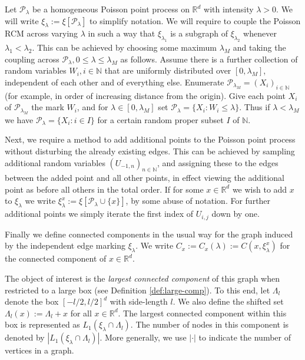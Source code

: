 \documentclass[a4paper,12pt]{scrartcl}
\newcommand{\nats}{\mathbb{N}}
\newcommand{\reals}{\mathbb{R}}
\theoremstyle{definition}
\theoremstyle{remark}
\begin{document}
Let $\mathcal P_\lambda$ be a homogeneous Poisson point process on $\reals^d$ with intensity $\lambda>0$.
We will write $\xi_\lambda := \xi[\mathcal P_\lambda]$ to simplify notation.
We will require to couple the Poisson RCM across varying $\lambda$ in
such a way that $\xi_{\lambda_1}$ is a subgraph of $\xi_{\lambda_2}$
whenever $\lambda_1 < \lambda_2$.
This can be achieved by choosing some maximum $\lambda_M$ and taking the coupling across $\mathcal P_\lambda, 0 \leq \lambda \leq \lambda_M$ as follows.
Assume there is a further collection of random variables
$W_i, i \in \mathbb N$ that are uniformly distributed over $[0,\lambda_M]$,
independent of each other and of everything else. Enumerate
$\mathcal P_{\lambda_M} = (X_i)_{i \in \mathbb N}$ (for example, in order of increasing distance from the origin). %
Give each point
$X_i$ of $\mathcal P_{\lambda_M}$ the mark $W_i$, and for $\lambda \in [0, \lambda_M]$ set $\mathcal P_{\lambda} = \{X_{i}: W_i \leq \lambda \}$.
Thus if $\lambda  < \lambda_M$ we have $\mathcal P_{\lambda}  =
\{X_i: i \in I\}$ for a certain random proper subset $I$ of $\mathbb N$.


Next, we require a method to add additional points to the Poisson point process without disturbing the already existing edges. This can be achieved by sampling additional random variables $(U_{-1, n})_{n\in\nats}$, and assigning these to the edges between the added point and all other points, in effect viewing the additional point as before all others in the total order. If for some $x\in\reals^d$ we wish to add $x$ to $\xi_\lambda$ we write $\xi_\lambda^x := \xi[\mathcal P_\lambda\cup \{x\}]$, by some abuse of notation.
For further additional points we simply iterate the first index of $U_{i, j}$ down by one.

Finally we define connected components in the usual way for the graph induced by the independent edge marking $\xi_\lambda$. We write $C_x := C_x(\lambda) := C(x, \xi^x_\lambda)$ for the connected component of $x\in\reals^d$.

The object of interest is the \emph{largest connected component} of this graph when restricted to a large box (see Definition \ref{def:large-comp}). To this end, let $\Lambda_l$ denote the box $[-l/2, l/2]^d$ with side-length $l$. We also define the shifted set $\Lambda_l(x) := \Lambda_l + x$ for all $x\in\reals^d$. The largest connected component within this box is represented as $L_1(\xi_{\lambda} \cap \Lambda_l)$. The number of nodes in this component is denoted by $|L_1(\xi_{\lambda} \cap \Lambda_l)|$. More generally, we use $|\cdot|$ to indicate the number of vertices in a graph.
\end{document}
